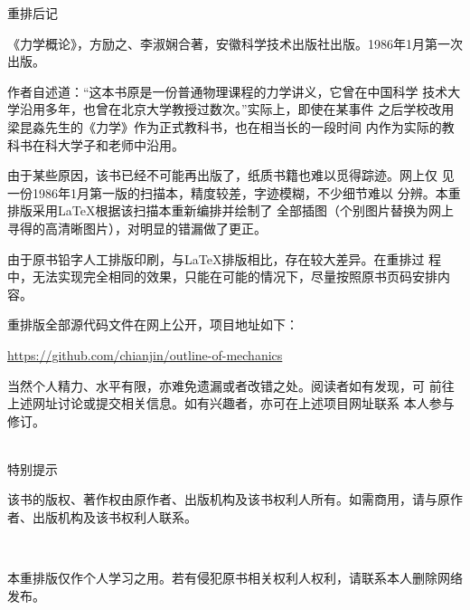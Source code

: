 \clearpage
\pagestyle{empty}
\setcounter{page}{1}
\label{afterword}
\begin{center}
  \xbsong 重\hspace{0.333em}排\hspace{0.333em}后\hspace{0.333em}记
\end{center}
\vspace{1em}



《力学概论》，方励之、李淑娴合著，安徽科学技术出版社出版。1986年1月第一次出版。

作者自述道：“这本书原是一份普通物理课程的力学讲义，它曾在中国科学
技术大学沿用多年，也曾在北京大学教授过数次。”实际上，即使在某事件
之后学校改用梁昆淼先生的《力学》作为正式教科书，也在相当长的一段时间
内作为实际的教科书在科大学子和老师中沿用。

由于某些原因，该书已经不可能再出版了，纸质书籍也难以觅得踪迹。网上仅
见一份1986年1月第一版的扫描本，精度较差，字迹模糊，不少细节难以
分辨。本重排版采用\LaTeX 根据该扫描本重新编排并绘制了
全部插图（个别图片替换为网上寻得的高清晰图片），对明显的错漏做了更正。

由于原书铅字人工排版印刷，与\LaTeX 排版相比，存在较大差异。在重排过
程中，无法实现完全相同的效果，只能在可能的情况下，尽量按照原书页码安排内容。

重排版全部源代码文件在网上公开，项目地址如下：
\begin{center}
  \href{https://github.com/chianjin/outline-of-mechanics}{https://github.com/chianjin/outline-of-mechanics}
\end{center}

当然个人精力、水平有限，亦难免遗漏或者改错之处。阅读者如有发现，可
前往上述网址讨论或提交相关信息。如有兴趣者，亦可在上述项目网址联系
本人参与修订。

\clearpage
\label{tips}
\heiti {}
\begin{center}
  ~\\
  特\hspace{0.333em}别\hspace{0.333em}提\hspace{0.333em}示
\end{center}
\normalsize
\vspace{1em}

该书的版权、著作权由原作者、出版机构及该书权利人所有。如需商用，请与原作者、出版机构及该书权利人联系。

~

本重排版仅作个人学习之用。若有侵犯原书相关权利人权利，请联系本人删除网络发布。
